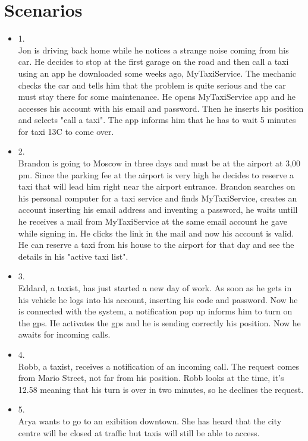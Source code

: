 \section {Scenarios}
\begin{itemize}
\item 1. \\
Jon is driving back home while he notices a strange noise coming from his car. He decides to stop at the first garage
on the road and then call a taxi using an app he downloaded some weeks ago, MyTaxiService.
The mechanic checks the car and tells him that the problem is quite serious and the car must stay there for some maintenance. 
He opens MyTaxiService app and he accesses his account with his email and password. Then he inserts his position and selects "call a taxi".
The app informs him that he has to wait 5 minutes for taxi 13C to come over.
\item 2.\\
Brandon is going to Moscow in three days and must be at the airport at 3,00 pm. Since the parking fee at the airport is very high
he decides to reserve a taxi that will lead him right near the airport entrance.
Brandon searches on his personal computer for a taxi service and finds MyTaxiService, creates an account inserting his email address and inventing a password,
he waits untill he receives a mail from MyTaxiService at the same email account he gave while signing in. He clicks the link in the mail
and now his account is valid. He can reserve a taxi from his house to the airport for that day and see the details in his "active taxi list".
\item 3.\\
Eddard, a taxist, has just started a new day of work.
As soon as he gets in his vehicle he logs into his account, inserting his code and password.
Now he is connected with the system, a notification pop up informs him to turn on the gps. He activates the gps and he is sending correctly his position. 
Now he awaits for incoming calls.
\item 4.\\
Robb, a taxist, receives a notification of an incoming call. The request comes from Mario Street, not far from his position.
Robb looks at the time, it's 12.58 meaning that his turn is over in two minutes, so he declines the request.
\item 5.\\
Arya wants to go to an exibition downtown.
She has heard that the city centre will be closed at traffic but taxis will still be able to access. 

\end{itemize}
